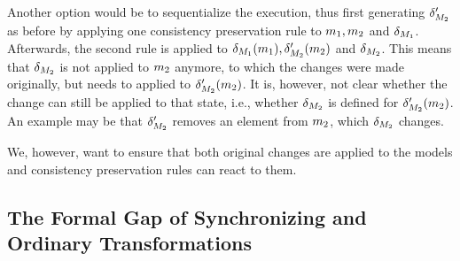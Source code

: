Another option would be to sequentialize the execution, thus first generating $\delta_{M_{2}}'$ as before by applying one consistency preservation rule to $m_{1},m_{2}$ and $\delta_{M_{1}}$.
Afterwards, the second rule is applied to $\delta_{M_{1}}(m_{1}),\delta_{M_{2}}'(m_{2})$ and $\delta_{M_{2}}$.
This means that $\delta_{M_{2}}$ is not applied to $m_{2}$ anymore, to which the changes were made originally, but needs to applied to $\delta_{M_{2}}'(m_{2})$.
It is, however, not clear whether the change can still be applied to that state, i.e., whether $\delta_{M_{2}}$ is defined for $\delta_{M_{2}}'(m_{2})$.
An example may be that $\delta_{M_{2}}'$ removes an element from $m_{2}$, which $\delta_{M_{2}}$ changes.

We, however, want to ensure that both original changes are applied to the models and consistency preservation rules can react to them.



\subsection{The Formal Gap of Synchronizing and Ordinary Transformations}

